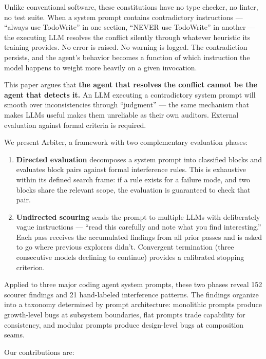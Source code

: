 \documentclass[
]{article}
\begin{document}
Unlike conventional software, these constitutions have no type checker,
no linter, no test suite. When a system prompt contains contradictory
instructions --- ``always use TodoWrite'' in one section, ``NEVER use
TodoWrite'' in another --- the executing LLM resolves the conflict
silently through whatever heuristic its training provides. No error is
raised. No warning is logged. The contradiction persists, and the
agent's behavior becomes a function of which instruction the model
happens to weight more heavily on a given invocation.

This paper argues that \textbf{the agent that resolves the conflict
cannot be the agent that detects it.} An LLM executing a contradictory
system prompt will smooth over inconsistencies through ``judgment'' ---
the same mechanism that makes LLMs useful makes them unreliable as their
own auditors. External evaluation against formal criteria is required.

We present Arbiter, a framework with two complementary evaluation
phases:

\begin{enumerate}
\def\labelenumi{\arabic{enumi}.}
\item
  \textbf{Directed evaluation} decomposes a system prompt into
  classified blocks and evaluates block pairs against formal
  interference rules. This is exhaustive within its defined search
  frame: if a rule exists for a failure mode, and two blocks share the
  relevant scope, the evaluation is guaranteed to check that pair.
\item
  \textbf{Undirected scouring} sends the prompt to multiple LLMs with
  deliberately vague instructions --- ``read this carefully and note
  what you find interesting.'' Each pass receives the accumulated
  findings from all prior passes and is asked to go where previous
  explorers didn't. Convergent termination (three consecutive models
  declining to continue) provides a calibrated stopping criterion.
\end{enumerate}

Applied to three major coding agent system prompts, these two phases
reveal 152 scourer findings and 21 hand-labeled interference patterns.
The findings organize into a taxonomy determined by prompt architecture:
monolithic prompts produce growth-level bugs at subsystem boundaries,
flat prompts trade capability for consistency, and modular prompts
produce design-level bugs at composition seams.

Our contributions are:
\end{document}
